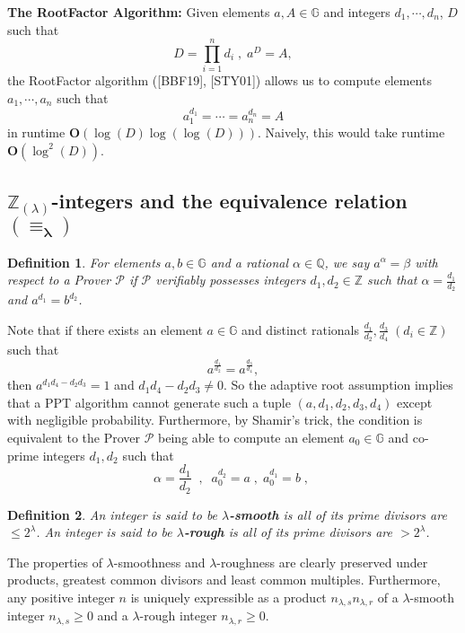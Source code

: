 \documentclass[11pt, lettersize, notitlepage, leqno, footskip=0.6cm]{article}
\newcommand{\bz}{\mathbb Z}
\newcommand{\bq}{\mathbb Q}
\newcommand{\pl}{\prod\limits}
\newcommand{\mc}{\mathcal}
\newcommand{\mb}{\mathbb}
\newcommand{\mbf}{\mathbf}
\newcommand{\al}{\alpha}
\newcommand{\be}{\beta}
\newcommand{\lam}{\lambda}
\newcommand{\lamb}{\lambda}
\newcommand{\mP}{\mc{P}}
\newcommand{\vs}{\vspace{-0.15cm}}
\newcommand{\noin}{\noindent}
\newtheorem{Def}{Definition}[section]
\numberwithin{equation}{section}
\begin{document}
\vspace{0.2cm}


\noindent \textbf{The RootFactor Algorithm:} Given elements $a, A\in\mb{G}$ and integers $d_1,\cdots, d_n$, $D$ such that \vs $$D= \pl_{i=1}^n d_i\; ,\; a^{D} = A,$$ the RootFactor algorithm ([BBF19], [STY01]) allows us to compute elements $a_1,\cdots, a_n$ such that \vs $$a_1^{d_1}=\cdots = a_n^{d_n} = A$$ in runtime $\mbf{O}(\log(D)\log(\log(D)))$. Naively, this would take runtime $\mbf{O}(\log^2(D))$.


\subsection{\fontsize{11}{11}\selectfont $\bz_{(\lamb)}$-integers and the equivalence relation $\mathbf{(\equiv_{\lam})}$}


\begin{Def} For elements $a, b\in\mb{G}$ and a rational $\al\in\bq$, we say $a^{\al} = \be$ with respect to a Prover $\mP$ if $\mP$ verifiably possesses integers $d_1,d_2\in\bz$ such that $\al = \frac{d_1}{d_2}$ and  $a^{d_1} = b^{d_2}$.\end{Def}

\noin Note that if there exists an element $a\in\mb{G}$ and distinct rationals $\frac{d_1}{d_2}, \frac{d_3}{d_4}\;(d_i\in\bz)$ such that \vs $$a^{\frac{d_1}{d_2}} = a^{\frac{d_3}{d_4}},$$ then $a^{d_1d_4-d_2d_3} = 1$ and $d_1d_4-d_2d_3\neq 0$. So the adaptive root assumption implies that a PPT algorithm cannot generate such a tuple $(a,d_1,d_2,d_3,d_4)$ except with negligible probability. Furthermore, by Shamir's trick, the condition is equivalent to the Prover $\mP$ being able to compute an element $a_0\in\mb{G}$ and co-prime integers $d_1,d_2$ such that \vs $$\al = \frac{d_1}{d_2}\;\;,\;\;a_0^{d_2} =a\;,\; a_0^{d_1} =b\;,\; $$


\begin{Def} An integer is said to be \textbf{$\lamb$-smooth} is all of its prime divisors are $\leq 2^{\lamb}$. An integer is said to be \textbf{$\lamb$-rough} is all of its prime divisors are $> 2^{\lamb}$.\end{Def}

\noindent The properties of $\lamb$-smoothness and $\lamb$-roughness are clearly preserved under products, greatest common divisors and least common multiples. Furthermore, any positive integer $n$ is uniquely expressible as a product $n_{{\lam,s}}n_{{\lam,r}}$ of a $\lam$-smooth integer $n_{{\lam,s}}\geq 0$ and a $\lam$-rough integer $n_{{\lam,r}}\geq 0$.
\end{document}
